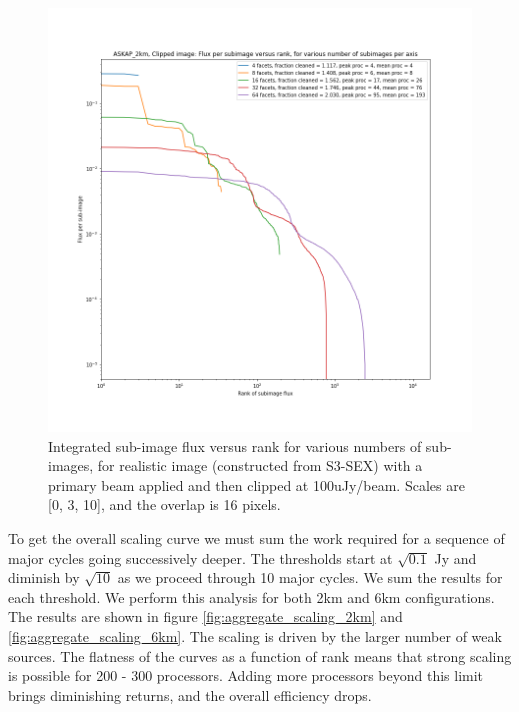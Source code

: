 \documentclass[11pt,a4paper,variablewidth]{article}
\begin{document}
\begin{figure}[H]
  \centering
  \includegraphics[width=\textwidth]{./pngs/fluxes_clipped_image_ASKAP_2km.png}
  \caption{Integrated sub-image flux versus rank for various numbers of sub-images, for realistic image (constructed from S3-SEX) with a primary beam applied and then clipped at 100uJy/beam. Scales are [0, 3, 10], and the overlap is 16 pixels.} 
  \label{fig:fractions_clipped_image}
\end{figure}

To get the overall scaling curve we must sum the work required for a sequence of major cycles going successively deeper. The thresholds start at $\sqrt{0.1}$ Jy and diminish by $\sqrt{10}$ as we proceed through 10 major cycles. We sum the results for each threshold. We perform this analysis for both 2km and 6km configurations. The results are shown in figure \ref{fig:aggregate_scaling_2km} and \ref{fig:aggregate_scaling_6km}. The scaling is driven by the larger number of weak sources. The flatness of the curves as a function of rank means that strong scaling is possible for 200 - 300 processors. Adding more processors beyond this limit brings diminishing returns, and the overall efficiency drops.
\end{document}

